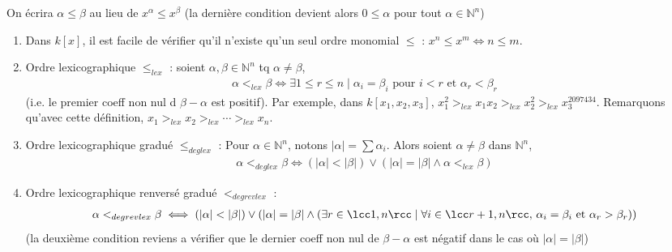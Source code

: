             \begin{nota}
                On écrira $\alpha \leq \beta$ au lieu de $x^\alpha \leq x^\beta$ (la dernière condition devient alors $0 \leq \alpha$ pour tout $\alpha \in \mathbb{N}^n$)
            \end{nota}
            \begin{expl}
                \begin{enumerate}
                    \item Dans $k[x]$, il est facile de vérifier qu'il n'existe qu'un seul ordre monomial $\leq$ : $x^n \leq x^m \iff n \leq m$.
                    \item Ordre lexicographique $\leq_{lex}$ : soient $\alpha, \beta \in \mathbb{N}^n$ tq $\alpha \neq \beta$,
                    \begin{align*}
                        \alpha <_{lex} \beta \iff \exists 1 \leq r \leq n \mid \alpha_i = \beta_i \text{ pour } i < r \text{ et } \alpha_r < \beta_r
                    \end{align*}
                    (i.e. le premier coeff non nul d $\beta - \alpha$ est positif). Par exemple, dans $k[x_1, x_2, x_3]$, $x_1^2 >_{lex} x_1x_2 >_{lex} x_2^2 >_{lex} x_3^{2097434}$. Remarquons qu'avec cette définition, $x_1 >_{lex} x_2 >_{lex} \cdots >_{lex} x_n$.
                    \item Ordre lexicographique gradué $\leq_{deglex}$ : Pour $\alpha \in \mathbb{N}^n$, notons $|\alpha| = \sum \alpha_i$. Alors soient $\alpha \neq \beta$ dans $\mathbb{N}^n$,
                    \begin{align*}
                        \alpha <_{deglex} \beta \iff (|\alpha| < |\beta|) \lor (|\alpha| = |\beta| \land \alpha <_{lex} \beta)
                    \end{align*}
                    \item Ordre lexicographique renversé gradué $<_{degrevlex}$ :
                    \begin{align*}
                        \alpha <_{degrevlex} \beta \iff (|\alpha| < |\beta|) \lor (|\alpha| = |\beta| \land (\exists r \in \lcc 1,n \rcc  \mid \forall i \in \lcc r+1, n \rcc,\, \alpha_i = \beta_i  \text{ et } \alpha_r > \beta_r))
                    \end{align*}
                    (la deuxième condition reviens a vérifier que le dernier coeff non nul de $\beta - \alpha$ est négatif dans le cas où $|\alpha| = |\beta|$)
                \end{enumerate}
            \end{expl} \noindent
